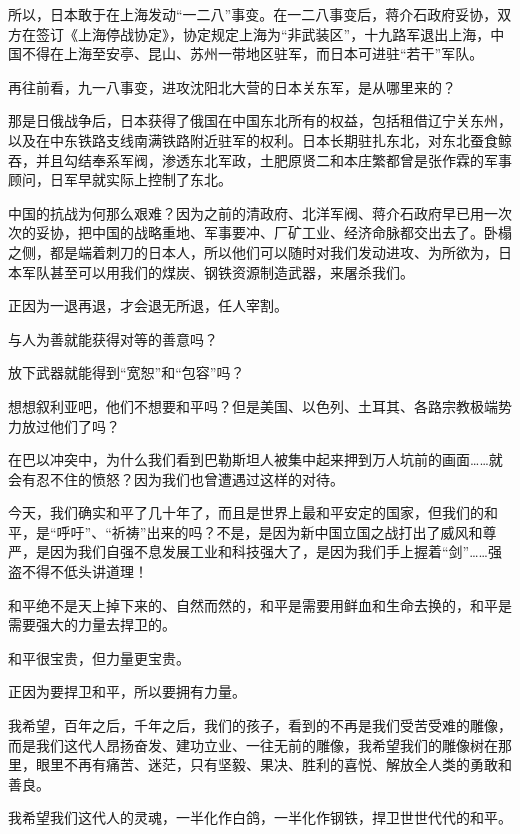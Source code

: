 \documentclass[UTF8,11pt,oneside]{ctexart}
\begin{document}
所以，日本敢于在上海发动“一二八”事变。在一二八事变后，蒋介石政府妥协，双方在签订《上海停战协定》，协定规定上海为“非武装区”，十九路军退出上海，中国不得在上海至安亭、昆山、苏州一带地区驻军，而日本可进驻“若干”军队。

再往前看，九一八事变，进攻沈阳北大营的日本关东军，是从哪里来的？

那是日俄战争后，日本获得了俄国在中国东北所有的权益，包括租借辽宁关东州，以及在中东铁路支线南满铁路附近驻军的权利。日本长期驻扎东北，对东北蚕食鲸吞，并且勾结奉系军阀，渗透东北军政，土肥原贤二和本庄繁都曾是张作霖的军事顾问，日军早就实际上控制了东北。

中国的抗战为何那么艰难？因为之前的清政府、北洋军阀、蒋介石政府早已用一次次的妥协，把中国的战略重地、军事要冲、厂矿工业、经济命脉都交出去了。卧榻之侧，都是端着刺刀的日本人，所以他们可以随时对我们发动进攻、为所欲为，日本军队甚至可以用我们的煤炭、钢铁资源制造武器，来屠杀我们。

正因为一退再退，才会退无所退，任人宰割。

与人为善就能获得对等的善意吗？

放下武器就能得到“宽恕”和“包容”吗？

想想叙利亚吧，他们不想要和平吗？但是美国、以色列、土耳其、各路宗教极端势力放过他们了吗？

在巴以冲突中，为什么我们看到巴勒斯坦人被集中起来押到万人坑前的画面……就会有忍不住的愤怒？因为我们也曾遭遇过这样的对待。

今天，我们确实和平了几十年了，而且是世界上最和平安定的国家，但我们的和平，是“呼吁”、“祈祷”出来的吗？不是，是因为新中国立国之战打出了威风和尊严，是因为我们自强不息发展工业和科技强大了，是因为我们手上握着“剑”……强盗不得不低头讲道理！

和平绝不是天上掉下来的、自然而然的，和平是需要用鲜血和生命去换的，和平是需要强大的力量去捍卫的。

和平很宝贵，但力量更宝贵。

正因为要捍卫和平，所以要拥有力量。

我希望，百年之后，千年之后，我们的孩子，看到的不再是我们受苦受难的雕像，而是我们这代人昂扬奋发、建功立业、一往无前的雕像，我希望我们的雕像树在那里，眼里不再有痛苦、迷茫，只有坚毅、果决、胜利的喜悦、解放全人类的勇敢和善良。

我希望我们这代人的灵魂，一半化作白鸽，一半化作钢铁，捍卫世世代代的和平。
\end{document}
